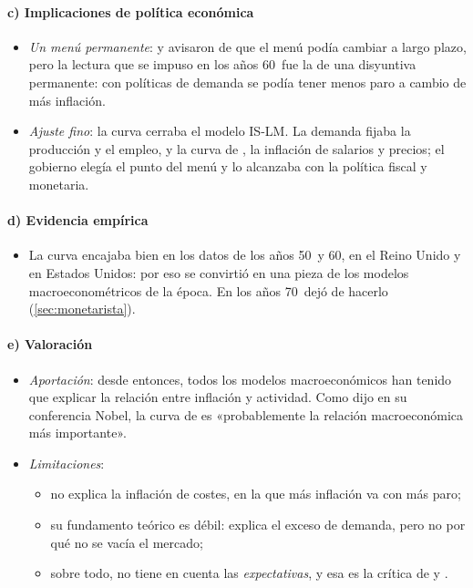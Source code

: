 \documentclass[11pt]{article}
\begin{document}
\paragraph{c) Implicaciones de política económica}

\begin{itemize}
\item \emph{Un menú permanente}:  y  avisaron de que el menú podía cambiar a largo plazo, pero la lectura que se impuso en los años 60~fue la de una disyuntiva permanente: con políticas de demanda se podía tener menos paro a cambio de más inflación.
\item \emph{Ajuste fino}: la curva cerraba el modelo IS-LM. La demanda fijaba la producción y el empleo, y la curva de , la inflación de salarios y precios; el gobierno elegía el punto del menú y lo alcanzaba con la política fiscal y monetaria.
\end{itemize}

\paragraph{d) Evidencia empírica}

\begin{itemize}
\item La curva encajaba bien en los datos de los años 50~y 60, en el Reino Unido y en Estados Unidos: por eso se convirtió en una pieza de los modelos macroeconométricos de la época. En los años 70~dejó de hacerlo (\ref{sec:monetarista}).
\end{itemize}

\paragraph{e) Valoración}

\begin{itemize}
\item \emph{Aportación}: desde entonces, todos los modelos macroeconómicos han tenido que explicar la relación entre inflación y actividad. Como dijo \textcite{Akerlof2002Behavioral} en su conferencia Nobel, la curva de  es «probablemente la relación macroeconómica más importante».
\item \emph{Limitaciones}:
  \begin{itemize}
  \item no explica la inflación de costes, en la que más inflación va con más paro;
  \item su fundamento teórico es débil:  explica el exceso de demanda, pero no por qué no se vacía el mercado;
  \item sobre todo, no tiene en cuenta las \emph{expectativas}, y esa es la crítica de  y .
  \end{itemize}
\end{itemize}
\end{document}
